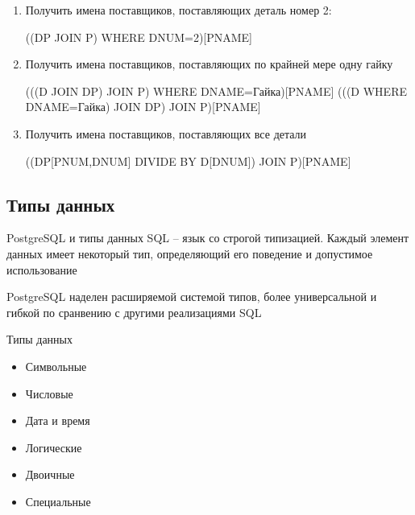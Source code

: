 \documentclass[12pt]{article}
\begin{document}
\begin{Example}{}
    \begin{enumerate}
        \item Получить имена поставщиков, поставляющих деталь номер 2:
        
        ((DP JOIN P) WHERE DNUM=2)[PNAME]

        \item Получить имена поставщиков, поставляющих по крайней мере одну гайку 
        
        (((D JOIN DP) JOIN P) WHERE DNAME=Гайка)[PNAME]
        (((D WHERE DNAME=Гайка) JOIN DP) JOIN P)[PNAME]

        \item Получить имена поставщиков, поставляющих все детали 
        
        ((DP[PNUM,DNUM] DIVIDE BY D[DNUM]) JOIN P)[PNAME]
    \end{enumerate}
\end{Example}

\newpage

\subsection{Типы данных}

\begin{defin}{PostgreSQL и типы данных}
    SQL -- язык со строгой типизацией. Каждый элемент данных имеет некоторый тип, определяющий его поведение и допустимое использование 

    PostgreSQL наделен расширяемой системой типов, более универсальной и гибкой по сранвению с другими реализациями SQL 
\end{defin}

\begin{nota}{Типы данных}
    \begin{itemize}
        \item Символьные 
        \item Числовые 
        \item Дата и время 
        \item Логические 
        \item Двоичные 
        \item Специальные 
    \end{itemize}
\end{nota}
\end{document}
